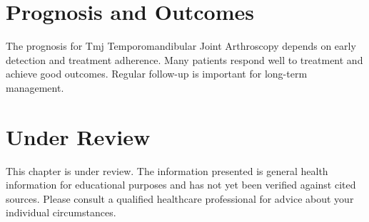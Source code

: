 \section*{Prognosis and Outcomes}
The prognosis for Tmj Temporomandibular Joint Arthroscopy depends on early detection and treatment adherence. Many patients respond well to treatment and achieve good outcomes. Regular follow-up is important for long-term management.
\section*{Under Review}
This chapter is under review. The information presented is general health information for educational purposes and has not yet been verified against cited sources. Please consult a qualified healthcare professional for advice about your individual circumstances.


\clearpage
